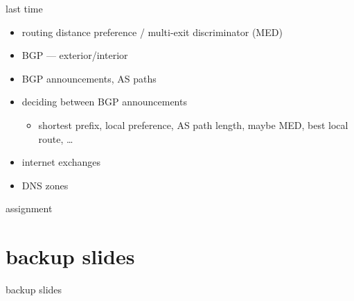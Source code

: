 \date{}
\title{}
\date{}

\begin{frame}
    \titlepage
\end{frame}



\begin{frame}{last time}
    \begin{itemize}
    \item routing distance preference / multi-exit discriminator (MED)
    \item BGP --- exterior/interior
    \item BGP announcements, AS paths
    \item deciding between BGP announcements
        \begin{itemize}
        \item shortest prefix, local preference, AS path length, maybe MED, best local route, \ldots
        \end{itemize}
    \item internet exchanges
    \vspace{.5cm}
    \item DNS zones
    \end{itemize}
\end{frame}





\begin{frame}{assignment}
\end{frame}




\section{backup slides}
\begin{frame}{backup slides}
\end{frame}


